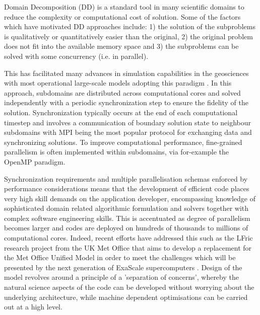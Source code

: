 \documentclass[acmsmall,review,anonymous]{acmart}\settopmatter{printfolios=true,printccs=false,printacmref=false}
\begin{document}
Domain Decomposition (DD) is a standard tool in many scientific domains to reduce the complexity or computational cost of solution. Some of the factors which have motivated DD approaches include: 1) the solution of the subproblems is qualitatively or quantitatively easier than the original, 2) the original problem does not fit into the available memory space and 3) the subproblems can be solved with some concurrency (i.e. in parallel).

This has facilitated many advances in simulation capabilities in the geosciences with most operational large-scale models adopting this paradigm \citep{michalakes2001development, hu2013scalable, hammond2014evaluating}. In this approach, subdomains are distributed across computational cores and solved independently with a periodic synchronization step to ensure the fidelity of the solution. Synchronization typically occurs at the end of each computational timestep and involves a communication of boundary solution state to neighbour subdomains with MPI being the most popular protocol for exchanging data and synchronizing solutions. To improve computational performance, fine-grained parallelism is often implemented within subdomains, via for-example the OpenMP paradigm.

Synchronization requirements and multiple parallelisation schemas enforced by performance considerations means that the development of efficient code places very high skill demands on the application developer, encompassing knowledge of sophisticated domain related algorithmic formulation and solvers together with complex software engineering skills. This is accentuated as degree of parallelism becomes larger and codes are deployed on hundreds of thousands to millions of computational cores. Indeed, recent efforts have addressed this such as the LFric research project from the UK Met Office that aims to develop a replacement for the Met Office Unified Model in order to meet the challenges which will be presented by the next generation of ExaScale supercomputers \citep{melvin2017lfric}. Design of the model revolves around a principle of a 'separation of concerns', whereby the natural science aspects of the code can be developed without worrying about the underlying architecture, while machine dependent optimisations can be carried out at a high level.
\end{document}
